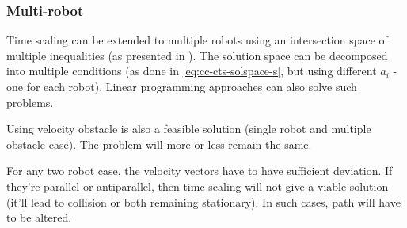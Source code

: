 \subsubsection{Multi-robot}

Time scaling can be extended to multiple robots using an intersection space of multiple inequalities (as presented in \cite{rca-multirobot-rrc}). The solution space can be decomposed into multiple conditions (as done in \ref{eq:cc-cts-solspace-s}, but using different $a_i$ - one for each robot). 
Linear programming approaches can also solve such problems.

Using velocity obstacle \cite{fiorini98-vel-obs} is also a feasible solution (single robot and multiple obstacle case). The problem will more or less remain the same.

For any two robot case, the velocity vectors have to have sufficient deviation. If they're parallel or antiparallel, then time-scaling will not give a viable solution (it'll lead to collision or both remaining stationary). In such cases, path will have to be altered.
